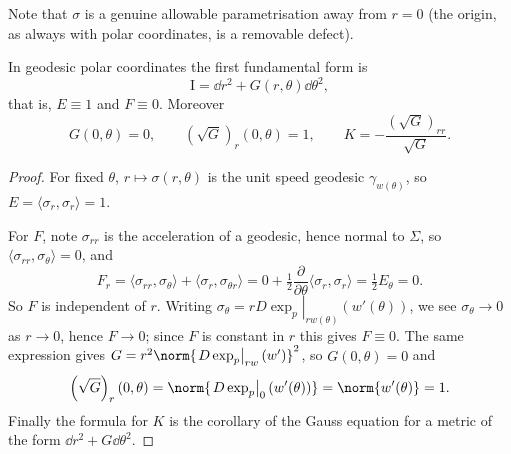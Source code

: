 \documentclass[a4paper]{scrartcl}
\begin{document}
Note that $\sigma$ is a genuine allowable parametrisation away from $r=0$ (the origin, as always with polar coordinates, is a removable defect).

\begin{center}
\end{center}

\begin{proposition}
    In geodesic polar coordinates the first fundamental form is
    $$
    \mathrm{I} = \dd r^2 + G(r,\theta) \dd \theta^2,
    $$
    that is, $E \equiv 1$ and $F \equiv 0$. Moreover
    $$
    G(0,\theta) = 0, \qquad \left(\sqrt{G}\right)_r(0,\theta) = 1, \qquad K = -\frac{\left(\sqrt G\right)_{rr}}{\sqrt G}.
    $$
\end{proposition}
\begin{proof}
    For fixed $\theta$, $r \mapsto \sigma(r,\theta)$ is the unit speed geodesic $\gamma_{w(\theta)}$, so $E = \langle\sigma_r,\sigma_r\rangle = 1$.

    For $F$, note $\sigma_{rr}$ is the acceleration of a geodesic, hence normal to $\Sigma$, so $\langle \sigma_{rr}, \sigma_\theta\rangle = 0$, and
    $$
    F_r = \langle \sigma_{rr}, \sigma_\theta\rangle + \langle \sigma_r, \sigma_{\theta r}\rangle = 0 + \tfrac12 \frac{\partial}{\partial\theta}\langle\sigma_r,\sigma_r\rangle = \tfrac12 E_\theta = 0.
    $$
    So $F$ is independent of $r$. Writing $\sigma_\theta = r\left.D\exp_p\right|_{rw(\theta)}(w'(\theta))$, we see $\sigma_\theta \rightarrow 0$ as $r \rightarrow 0$, hence $F \rightarrow 0$; since $F$ is constant in $r$ this gives $F \equiv 0$. The same expression gives $G = r^2 \norm{\left.D\exp_p\right|_{rw}(w')}^2$, so $G(0,\theta) = 0$ and
    $$
    \left(\sqrt G\right)_r(0,\theta) = \norm{\left.D\exp_p\right|_0(w'(\theta))} = \norm{w'(\theta)} = 1.
    $$
    Finally the formula for $K$ is the corollary of the Gauss equation for a metric of the form $\dd r^2 + G \dd\theta^2$.
\end{proof}
\end{document}
